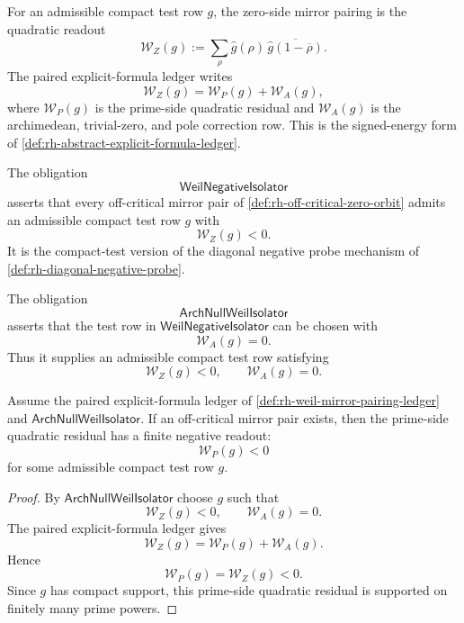\begin{definition}
\label{def:rh-weil-mirror-pairing-ledger}
For an admissible compact test row $g$, the zero-side mirror pairing is
the quadratic readout
$$
\mathcal W_Z(g)
:=
\sum_{\rho}\widehat g(\rho)\,
\overline{\widehat g(1-\overline{\rho})}.
$$
The paired explicit-formula ledger writes
$$
\mathcal W_Z(g)=\mathcal W_P(g)+\mathcal W_A(g),
$$
where $\mathcal W_P(g)$ is the prime-side quadratic residual and
$\mathcal W_A(g)$ is the archimedean, trivial-zero, and pole correction
row.  This is the signed-energy form of
\autoref{def:rh-abstract-explicit-formula-ledger}.
\end{definition}

\begin{definition}[WeilNegativeIsolator]
\label{def:rh-weil-negative-isolator}
The obligation
$$
\mathsf{WeilNegativeIsolator}
$$
asserts that every off-critical mirror pair of
\autoref{def:rh-off-critical-zero-orbit} admits an admissible compact
test row $g$ with
$$
\mathcal W_Z(g)<0.
$$
It is the compact-test version of the diagonal negative probe mechanism
of \autoref{def:rh-diagonal-negative-probe}.
\end{definition}

\begin{definition}[ArchNullWeilIsolator]
\label{def:rh-arch-null-weil-isolator}
The obligation
$$
\mathsf{ArchNullWeilIsolator}
$$
asserts that the test row in $\mathsf{WeilNegativeIsolator}$ can be chosen
with
$$
\mathcal W_A(g)=0.
$$
Thus it supplies an admissible compact test row satisfying
$$
\mathcal W_Z(g)<0,
\qquad
\mathcal W_A(g)=0.
$$
\end{definition}

\begin{theorem}
\label{thm:rh-arch-null-negative-isolation-prime-side-negative-energy}
Assume the paired explicit-formula ledger of
\autoref{def:rh-weil-mirror-pairing-ledger} and
$\mathsf{ArchNullWeilIsolator}$.  If an off-critical mirror pair exists,
then the prime-side quadratic residual has a finite negative readout:
$$
\mathcal W_P(g)<0
$$
for some admissible compact test row $g$.
\end{theorem}

\begin{proof}
By $\mathsf{ArchNullWeilIsolator}$ choose $g$ such that
$$
\mathcal W_Z(g)<0,
\qquad
\mathcal W_A(g)=0.
$$
The paired explicit-formula ledger gives
$$
\mathcal W_Z(g)=\mathcal W_P(g)+\mathcal W_A(g).
$$
Hence
$$
\mathcal W_P(g)=\mathcal W_Z(g)<0.
$$
Since $g$ has compact support, this prime-side quadratic residual is
supported on finitely many prime powers.
\end{proof}

